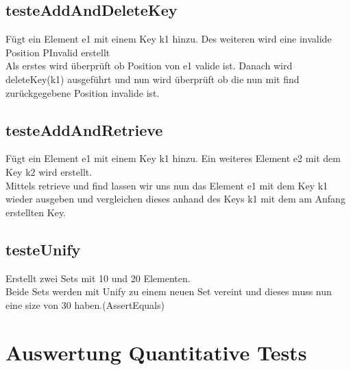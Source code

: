 \documentclass[paper=a4, fontsize=11pt]{scrartcl} %
\numberwithin{equation}{section} %
\numberwithin{figure}{section} %
\numberwithin{table}{section} %
\begin{document}
\subsection{testeAddAndDeleteKey}
Fügt ein Element e1 mit einem Key k1 hinzu. Des weiteren wird eine invalide Position PInvalid erstellt\\
Als erstes wird überprüft ob Position von e1 valide ist. Danach wird deleteKey(k1) ausgeführt und nun wird überprüft ob die nun mit find zurückgegebene Position invalide ist.

\subsection{testeAddAndRetrieve}
Fügt ein Element e1 mit einem Key k1 hinzu. Ein weiteres Element e2 mit dem Key k2 wird erstellt.\\
Mittels retrieve und find lassen wir uns nun das Element e1 mit dem Key k1 wieder ausgeben und vergleichen dieses anhand des Keys k1 mit dem am Anfang erstellten Key.

\subsection{testeUnify}
Erstellt zwei Sets mit 10 und 20 Elementen.\\
Beide Sets werden mit Unify zu einem neuen Set vereint und dieses muss nun eine size von 30 haben.(AssertEquals)

\section{Auswertung Quantitative Tests}
\end{document}

